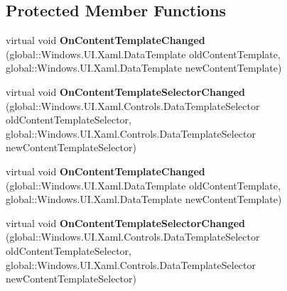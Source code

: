 \subsection*{Protected Member Functions}
\begin{DoxyCompactItemize}
\item 
\mbox{\label{class_windows_1_1_u_i_1_1_xaml_1_1_controls_1_1_content_presenter_ad3820a0a82beb44d845344bcf24db5ed}} 
virtual void {\bfseries On\+Content\+Template\+Changed} (global\+::\+Windows.\+U\+I.\+Xaml.\+Data\+Template old\+Content\+Template, global\+::\+Windows.\+U\+I.\+Xaml.\+Data\+Template new\+Content\+Template)
\item 
\mbox{\label{class_windows_1_1_u_i_1_1_xaml_1_1_controls_1_1_content_presenter_a1b2a7127c047a13c18f5edd7c107e14e}} 
virtual void {\bfseries On\+Content\+Template\+Selector\+Changed} (global\+::\+Windows.\+U\+I.\+Xaml.\+Controls.\+Data\+Template\+Selector old\+Content\+Template\+Selector, global\+::\+Windows.\+U\+I.\+Xaml.\+Controls.\+Data\+Template\+Selector new\+Content\+Template\+Selector)
\item 
\mbox{\label{class_windows_1_1_u_i_1_1_xaml_1_1_controls_1_1_content_presenter_ad3820a0a82beb44d845344bcf24db5ed}} 
virtual void {\bfseries On\+Content\+Template\+Changed} (global\+::\+Windows.\+U\+I.\+Xaml.\+Data\+Template old\+Content\+Template, global\+::\+Windows.\+U\+I.\+Xaml.\+Data\+Template new\+Content\+Template)
\item 
\mbox{\label{class_windows_1_1_u_i_1_1_xaml_1_1_controls_1_1_content_presenter_a1b2a7127c047a13c18f5edd7c107e14e}} 
virtual void {\bfseries On\+Content\+Template\+Selector\+Changed} (global\+::\+Windows.\+U\+I.\+Xaml.\+Controls.\+Data\+Template\+Selector old\+Content\+Template\+Selector, global\+::\+Windows.\+U\+I.\+Xaml.\+Controls.\+Data\+Template\+Selector new\+Content\+Template\+Selector)
\item 
\mbox{\label{class_windows_1_1_u_i_1_1_xaml_1_1_controls_1_1_content_presenter_ad3820a0a82beb44d845344bcf24db5ed}} 

\end{DoxyCompactItemize}

